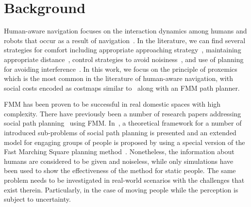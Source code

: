 \section{Background}
\label{Literature}


Human-aware navigation focuses on the interaction dynamics among humans and robots that occur as a result of navigation~\cite{Kruse2013}. 
In the literature, we can find several strategies for comfort including appropriate approaching strategy~\cite{Dautenhahn2006}, maintaining appropriate distance~\cite{Takayama2009}, control strategies to avoid noisiness~\cite{Martinson2007}, and use of planning for avoiding interference~\cite{Vasquez2012}. In this work, we focus on the principle of proxemics which is the most common in the literature of human-aware navigation, with social costs encoded as costmaps similar to~\cite{gomez2013social} along with an FMM path planner.



FMM has been proven to be successful in real domestic spaces with high complexity\cite{ventura2015}. There have previously been a number of research papers addressing social path planning~\cite{gomez2014fast,gomez2013social} using FMM. %
In~\cite{gomez2014fast}, a theoretical framework for a number of introduced sub-problems of social path planning is presented and an extended model for engaging groups of people is proposed by using a special version of the Fast Marching Square planning method~\cite{valero2013fast}. Nonetheless, the information about humans are considered to be given and noiseless, while only simulations have been used to show the effectiveness of the method for static people. The same problem needs to be investigated in real-world scenarios with the challenges that exist therein. Particularly, in the case of moving people while the perception is subject to uncertainty. 



